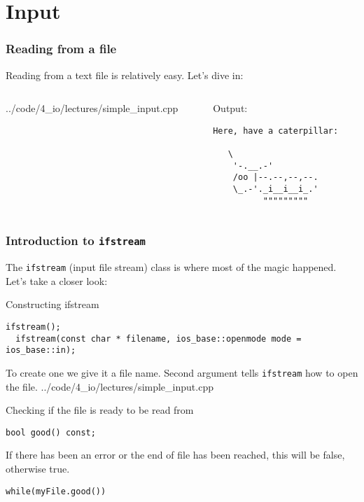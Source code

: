 \documentclass[handout]{beamer}
\begin{document}
\section{Input}

\begin{frame}[fragile]
	\frametitle{Reading from a file}
	
	Reading from a text file is relatively easy.  Let's dive in:
	\begin{columns}[t]
	  \begin{column}[T]{0.5\textwidth}
    		{../code/4_io/lectures/simple_input.cpp}
		\end{column}
		\pause
		\begin{column}[T]{0.5\textwidth}
		  Output:
			\begin{verbatim}Here, have a caterpillar:
						
   \
    '-.__.-'
    /oo |--.--,--,--.
    \_.-'._i__i__i_.'
          """""""""
		\end{verbatim}
		\end{column}
	\end{columns}
\end{frame}

\begin{frame}[fragile]
  \frametitle{Introduction to \texttt{ifstream}}
  
  The \texttt{ifstream} (input file stream) class is where most of the magic happened.  Let's take a closer look:
  \pause
  \begin{block}{Constructing ifstream}
  	\begin{lstlisting}[aboveskip=0pt]
  ifstream();
  ifstream(const char * filename, ios_base::openmode mode = ios_base::in);
		\end{lstlisting}
		To create one we give it a file name.  Second argument tells \texttt{ifstream} how to open the file.
    		{../code/4_io/lectures/simple_input.cpp}
  \end{block}
  \pause
  \begin{block}{Checking if the file is ready to be read from}
  	\begin{lstlisting}[aboveskip=0pt]
  bool good() const;
  	\end{lstlisting}
  	If there has been an error or the end of file has been reached, this will be false, otherwise true.
  	\begin{lstlisting}[belowskip=0pt]
  while(myFile.good())
  	\end{lstlisting}
  \end{block}
\end{frame}
\end{document}
